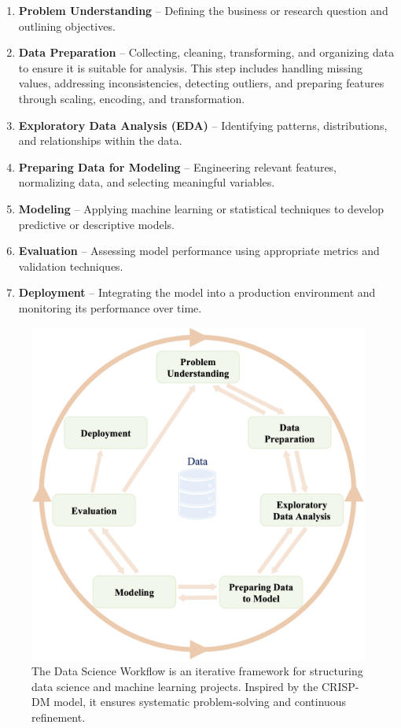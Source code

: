 \documentclass[
  11pt,
]{book}
\providecommand{\tightlist}{%
  \setlength{\itemsep}{0pt}\setlength{\parskip}{0pt}}
\theoremstyle{definition}
\theoremstyle{definition}
\theoremstyle{definition}
\theoremstyle{definition}
\theoremstyle{remark}
\begin{document}
\begin{enumerate}
\def\labelenumi{\arabic{enumi}.}
\tightlist
\item
  \textbf{Problem Understanding} -- Defining the business or research question and outlining objectives.\\
\item
  \textbf{Data Preparation} -- Collecting, cleaning, transforming, and organizing data to ensure it is suitable for analysis. This step includes handling missing values, addressing inconsistencies, detecting outliers, and preparing features through scaling, encoding, and transformation.\\
\item
  \textbf{Exploratory Data Analysis (EDA)} -- Identifying patterns, distributions, and relationships within the data.\\
\item
  \textbf{Preparing Data for Modeling} -- Engineering relevant features, normalizing data, and selecting meaningful variables.\\
\item
  \textbf{Modeling} -- Applying machine learning or statistical techniques to develop predictive or descriptive models.\\
\item
  \textbf{Evaluation} -- Assessing model performance using appropriate metrics and validation techniques.\\
\item
  \textbf{Deployment} -- Integrating the model into a production environment and monitoring its performance over time.
\end{enumerate}

\begin{figure}[H]

{\centering \includegraphics[width=0.7\linewidth]{images/ch2_DSW} 

}

\caption{The Data Science Workflow is an iterative framework for structuring data science and machine learning projects. Inspired by the CRISP-DM model, it ensures systematic problem-solving and continuous refinement.}\label{fig:CRISP-DM}
\end{figure}
\end{document}
